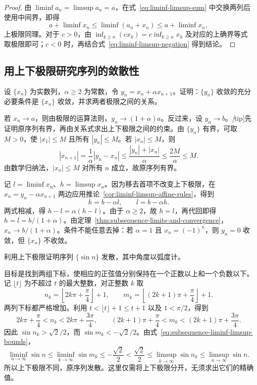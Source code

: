 \documentclass[UTF8,12pt,a4paper,fontset=fandol]{ctexbook}
\begin{document}
\begin{proof}
由 $\liminf a_n=\limsup a_n=a$，在式~\eqref{eq:liminf-limsup-sum} 中交换两列后使用中间界，即得
\[
    a+\liminf x_n\leq\liminf(a_n+x_n)\leq a+\liminf x_n,
\]
上极限同理。对于 $c>0$，由 $\inf_{k\geq n}(cx_k)=c\inf_{k\geq n}x_k$ 及对应的上确界等式取极限即可；$c<0$ 时，再结合式~\eqref{eq:liminf-limsup-negation} 得到结论。
\end{proof}

\subsection{用上下极限研究序列的敛散性}
\label{subsec:liminf-limsup-applications}

\begin{example}
设 $\{x_n\}$ 为实数列，$\alpha\geq2$ 为常数，令 $y_n=x_n+\alpha x_{n+1}$。证明：$\{y_n\}$ 收敛的充分必要条件是 $\{x_n\}$ 收敛，并求两者极限之间的关系。
\end{example}

\begin{solve}
若 $x_n\to a$，则由极限的运算法则，$y_n\to(1+\alpha)a$。反过来，设 $y_n\to b$。\emph[tip]{先证明原序列有界，再由关系式求出上下极限之间的约束。}由 $\{y_n\}$ 有界，可取 $M>0$，使 $|x_1|\leq M$ 且所有 $|y_n|\leq M$。若 $|x_n|\leq M$，则
\[
    |x_{n+1}|=\frac1\alpha|y_n-x_n|
    \leq\frac{|y_n|+|x_n|}{\alpha}
    \leq\frac{2M}{\alpha}\leq M.
\]
由数学归纳法，$|x_n|\leq M$ 对所有 $n$ 成立，故原序列有界。

记 $l=\liminf x_n$、$h=\limsup x_n$。因为移去首项不改变上下极限，在 $x_n=y_n-\alpha x_{n+1}$ 两边应用推论~\ref{cor:liminf-limsup-affine-rules}，得到
\[
    h=b-\alpha l,\qquad l=b-\alpha h.
\]
两式相减，得 $h-l=\alpha(h-l)$。由于 $\alpha\geq2$，故 $h=l$，再代回即得 $h=l=b/(1+\alpha)$。由定理~\ref{thm:subsequence-limits-and-convergence}，$x_n\to b/(1+\alpha)$。条件不能任意去掉：若 $\alpha=1$ 且 $x_n=(-1)^n$，则 $y_n=0$ 收敛，但 $\{x_n\}$ 不收敛。
\end{solve}

\begin{example}
利用上下极限证明序列 $\{\sin n\}$ 发散，其中角度以弧度计。
\end{example}

\begin{solve}
目标是找到两组下标，使相应的正弦值分别保持在一个正数以上和一个负数以下。记 $\lfloor t\rfloor$ 为不超过 $t$ 的最大整数，对正整数 $k$ 取
\[
    n_k=\left\lfloor2k\pi+\frac\pi4\right\rfloor+1,
    \qquad
    m_k=\left\lfloor(2k+1)\pi+\frac\pi4\right\rfloor+1.
\]
两列下标都严格增加。利用 $t<\lfloor t\rfloor+1\leq t+1$ 以及 $1<\pi/2$，得到
\[
    2k\pi+\frac\pi4<n_k<2k\pi+\frac{3\pi}4,
    \qquad
    (2k+1)\pi+\frac\pi4<m_k<(2k+1)\pi+\frac{3\pi}4.
\]
因此 $\sin n_k>\sqrt2/2$，而 $\sin m_k<-\sqrt2/2$。由式~\eqref{eq:subsequence-liminf-limsup-bounds}，
\[
    \liminf_{n\to\infty}\sin n
    \leq\liminf_{k\to\infty}\sin m_k
    \leq-\frac{\sqrt2}{2}
    <\frac{\sqrt2}{2}
    \leq\limsup_{k\to\infty}\sin n_k
    \leq\limsup_{n\to\infty}\sin n.
\]
所以上下极限不同，原序列发散。这里仅需将上下极限分开，无须求出它们的精确值。
\end{solve}
\end{document}
